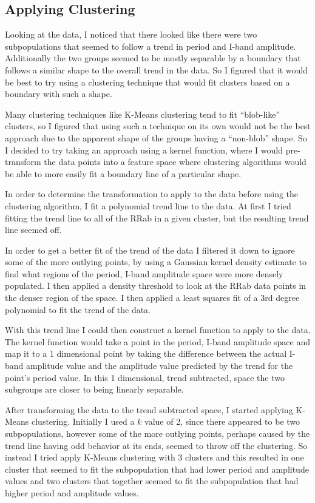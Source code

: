 \documentclass[]{article}
\begin{document}
\subsection{Applying Clustering}
Looking at the data, I noticed that there looked like there were two subpopulations that seemed to follow a trend in period and I-band amplitude. Additionally the two groups seemed to be mostly separable by a boundary that follows a similar shape to the overall trend in the data. So I figured that it would be best to try using a clustering technique that would fit clusters based on a boundary with such a shape.

Many clustering techniques like K-Means clustering tend to fit ``blob-like'' clusters, so I figured that using such a technique on its own would not be the best approach due to the apparent shape of the groups having a ``non-blob'' shape. So I decided to try taking an approach using a kernel function, where I would pre-transform the data points into a feature space where clustering algorithms would be able to more easily fit a boundary line of a particular shape.

In order to determine the transformation to apply to the data before using the clustering algorithm, I fit a polynomial trend line to the data. At first I tried fitting the trend line to all of the RRab in a given cluster, but the resulting trend line seemed off.

In order to get a better fit of the trend of the data I filtered it down to ignore some of the more outlying points, by using a Gaussian kernel density estimate to find what regions of the period, I-band amplitude space were more densely populated. I then applied a density threshold to look at the RRab data points in the denser region of the space. I then applied a least squares fit of a 3rd degree polynomial to fit the trend of the data.

With this trend line I could then construct a kernel function to apply to the data. The kernel function would take a point in the period, I-band amplitude space and map it to a 1 dimensional point by taking the  difference between the actual I-band amplitude value and the amplitude value predicted by the trend for the point's period value. In this 1 dimensional, trend subtracted, space the two subgroups are closer to being linearly separable.

After transforming the data to the trend subtracted space, I started applying K-Means clustering. Initially I used a $k$ value of 2, since there appeared to be two subpopulations, however some of the more outlying points, perhaps caused by the trend line having odd behavior at its ends, seemed to throw off the clustering. So instead I tried apply K-Means clustering with 3 clusters and this resulted in one cluster that seemed to fit the subpopulation that had lower period and amplitude values and two clusters that together seemed to fit the subpopulation that had higher period and amplitude values.
\end{document}
